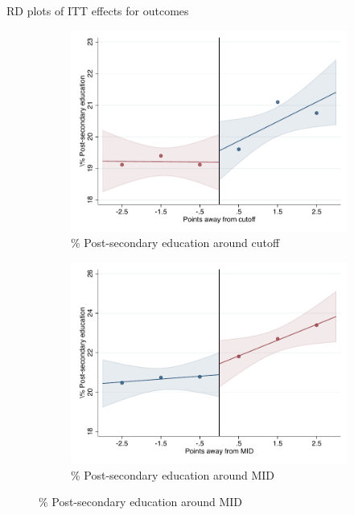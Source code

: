 \documentclass[notes,11pt, aspectratio=169]{beamer}
\begin{document}
\begin{frame}{RD plots of ITT effects for outcomes}
\hyperlink{ITT_rd_plot_IPN}{}
\begin{figure}

    \begin{subfigure}{0.45\textwidth}
        \centering
        \caption{\% Post-secondary education around cutoff}
        \includegraphics[width=\textwidth]{04_Figures/rd_plot_tau_licenciatura_mas_IPN3.pdf}
    \end{subfigure}
    \begin{subfigure}{0.45\textwidth}
        \centering
        \caption{\% Post-secondary education around MID}
        \includegraphics[width=\textwidth]{04_Figures/rd_plot_mid_licenciatura_mas_IPN3.pdf}
    \end{subfigure}
    
\end{figure}
\end{frame}
\end{document}

